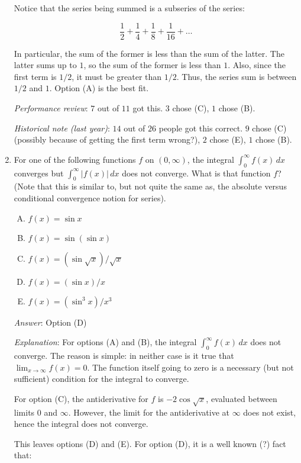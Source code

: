 \documentclass[10pt]{amsart}
\begin{document}
\begin{enumerate}
  Notice that the series being summed is a subseries of the series:

  $$\frac{1}{2} + \frac{1}{4} + \frac{1}{8} + \frac{1}{16} + \dots$$

  In particular, the sum of the former is less than the sum of the
  latter. The latter sums up to $1$, so the sum of the former is less
  than $1$. Also, since the first term is $1/2$, it must be greater
  than $1/2$. Thus, the series sum is between $1/2$ and $1$. Option
  (A) is the best fit.

  {\em Performance review}: $7$ out of $11$ got this. $3$ chose (C),
  $1$ chose (B).

  {\em Historical note (last year)}: $14$ out of $26$ people got this
  correct. $9$ chose (C) (possibly because of getting the first term
  wrong?), $2$ chose (E), $1$ chose (B).

\item For one of the following functions $f$ on $(0,\infty)$, the
  integral $\int_0^\infty f(x) \, dx$ converges but $\int_0^\infty
  |f(x)| \, dx$ does not converge. What is that function $f$? (Note
  that this is similar to, but not quite the same as, the absolute
  versus conditional convergence notion for series).

  \begin{enumerate}[(A)]
  \item $f(x) = \sin x$
  \item $f(x) = \sin(\sin x)$
  \item $f(x) = (\sin \sqrt{x})/\sqrt{x}$
  \item $f(x) = (\sin x)/x$
  \item $f(x) = (\sin^3x)/x^3$
  \end{enumerate}

  {\em Answer}: Option (D)

  {\em Explanation}: For options (A) and (B), the integral
  $\int_0^\infty f(x) \, dx$ does not converge. The reason is simple:
  in neither case is it true that $\lim_{x \to \infty} f(x) = 0$. The
  function itself going to zero is a necessary (but not sufficient)
  condition for the integral to converge.

  For option (C), the antiderivative for $f$ is $-2\cos\sqrt{x}$,
  evaluated between limits $0$ and $\infty$. However, the limit for
  the antiderivative at $\infty$ does not exist, hence the integral
  does not converge. 

  This leaves options (D) and (E). For option (D), it is a well known (?) fact that:


\end{enumerate}
\end{document}
